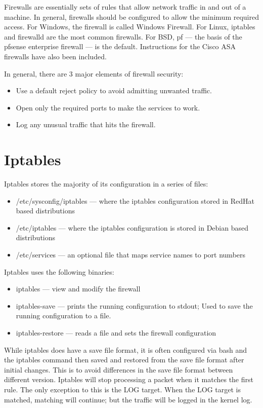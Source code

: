 Firewalls are essentially sets of rules that allow network traffic in and out of a machine.
In general, firewalls should be configured to allow the minimum required access.
For Windows, the firewall is called Windows Firewall.
For Linux, iptables and firewalld are the most common firewalls.
For BSD, pf --- the basis of the pfsense enterprise firewall --- is the default.
Instructions for the Cisco ASA firewalls have also been included.

In general, there are 3 major elements of firewall security:

\begin{itemize}
	\item Use a default reject policy to avoid admitting unwanted traffic.
	\item Open only the required ports to make the services to work.
	\item Log any unusual traffic that hits the firewall.
\end{itemize}

\section{Iptables}

Iptables stores the majority of its configuration in a series of files:
\begin{itemize}
	\item /etc/sysconfig/iptables --- where the iptables configuration stored in RedHat
		based distributions
	\item /etc/iptables --- where the iptables configuration is stored in Debian
		based distributions
	\item /etc/services --- an optional file that maps service names to port
		numbers
\end{itemize}

Iptables uses the following binaries:
\begin{itemize}
	\item iptables --- view and modify the firewall
	\item iptables-save --- prints the running configuration to stdout; Used to
		save the running configuration to a file.
	\item iptables-restore --- reads a file and sets the firewall configuration
\end{itemize}

While iptables does have a save file format, it is often configured via bash and the iptables command then saved and restored from the save file format after initial changes.
This is to avoid differences in the save file format between different version.
Iptables will stop processing a packet when it matches the first rule.
The only exception to this is the LOG target.
When the LOG target is matched, matching will continue; but the traffic will be
logged in the kernel log.

